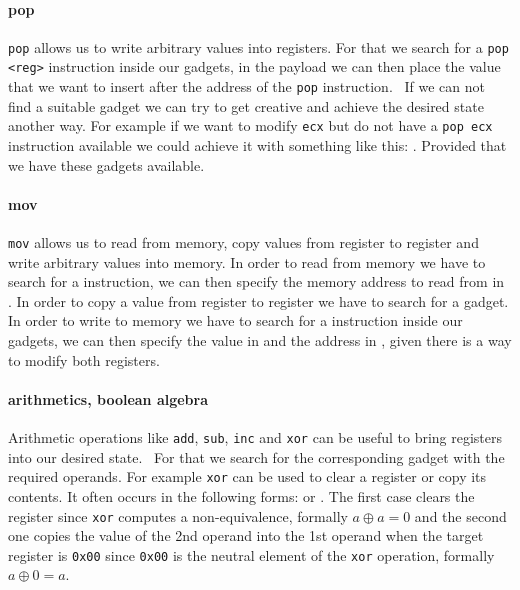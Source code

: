 \documentclass[journal=tosc,submission, notanonymous]{iacrtrans}
\begin{document}
\paragraph{pop}
\Verb+pop+ allows us to write arbitrary values into registers. For that we search for a \Verb+pop <reg>+ instruction inside our gadgets, in the payload we can then place the value that we want to insert after the address of the \Verb+pop+ instruction.~\cite{ropsla} If we can not find a suitable gadget we can try to get creative and achieve the desired state another way. For example if we want to modify \Verb+ecx+ but do not have a \Verb+pop ecx+ instruction available we could achieve it with something like this: . Provided that we have these gadgets available.
\paragraph{mov}
\Verb+mov+ allows us to read from memory, copy values from register to register and write arbitrary values into memory. In order to read from memory we have to search for a  instruction, we can then specify the memory address to read from in . In order to copy a value from register to register we have to search for a  gadget. In order to write to memory we have to search for a  instruction inside our gadgets, we can then specify the value in  and the address in , given there is a way to modify both registers.
\paragraph{arithmetics, boolean algebra}
Arithmetic operations like \Verb+add+, \Verb+sub+, \Verb+inc+ and \Verb+xor+ can be useful to bring registers into our desired state.~\cite{ropsla} For that we search for the corresponding gadget with the required operands. For example \Verb+xor+ can be used to clear a register or copy its contents. It often occurs in the following forms:  or . The first case clears the register since \Verb+xor+ computes a non-equivalence, formally $a \oplus a = 0$ and the second one copies the value of the 2nd operand into the 1st operand when the target register is \Verb+0x00+ since \Verb+0x00+ is the neutral element of the \Verb+xor+ operation, formally $a \oplus 0 = a$.
\end{document}
